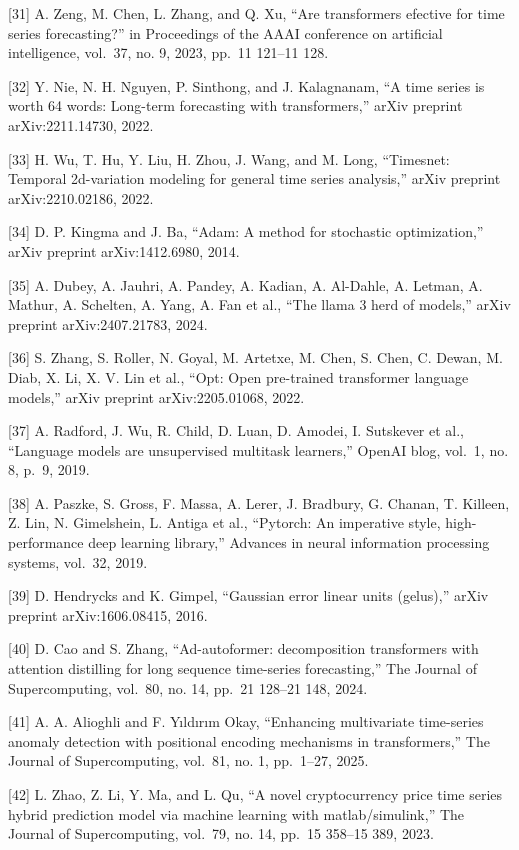 \documentclass[
  10
]{article}
\begin{document}
{[}31{]} A. Zeng, M. Chen, L. Zhang, and Q. Xu, ``Are transformers
efective for time series forecasting?'' in Proceedings of the AAAI
conference on artificial intelligence, vol.~37, no. 9, 2023, pp.~11
121--11 128.

{[}32{]} Y. Nie, N. H. Nguyen, P. Sinthong, and J. Kalagnanam, ``A time
series is worth 64 words: Long-term forecasting with transformers,''
arXiv preprint arXiv:2211.14730, 2022.

{[}33{]} H. Wu, T. Hu, Y. Liu, H. Zhou, J. Wang, and M. Long,
``Timesnet: Temporal 2d-variation modeling for general time series
analysis,'' arXiv preprint arXiv:2210.02186, 2022.

{[}34{]} D. P. Kingma and J. Ba, ``Adam: A method for stochastic
optimization,'' arXiv preprint arXiv:1412.6980, 2014.

{[}35{]} A. Dubey, A. Jauhri, A. Pandey, A. Kadian, A. Al-Dahle, A.
Letman, A. Mathur, A. Schelten, A. Yang, A. Fan et al., ``The llama 3
herd of models,'' arXiv preprint arXiv:2407.21783, 2024.

{[}36{]} S. Zhang, S. Roller, N. Goyal, M. Artetxe, M. Chen, S. Chen, C.
Dewan, M. Diab, X. Li, X. V. Lin et al., ``Opt: Open pre-trained
transformer language models,'' arXiv preprint arXiv:2205.01068, 2022.

{[}37{]} A. Radford, J. Wu, R. Child, D. Luan, D. Amodei, I. Sutskever
et al., ``Language models are unsupervised multitask learners,'' OpenAI
blog, vol.~1, no. 8, p.~9, 2019.

{[}38{]} A. Paszke, S. Gross, F. Massa, A. Lerer, J. Bradbury, G.
Chanan, T. Killeen, Z. Lin, N. Gimelshein, L. Antiga et al., ``Pytorch:
An imperative style, high-performance deep learning library,'' Advances
in neural information processing systems, vol.~32, 2019.

{[}39{]} D. Hendrycks and K. Gimpel, ``Gaussian error linear units
(gelus),'' arXiv preprint arXiv:1606.08415, 2016.

{[}40{]} D. Cao and S. Zhang, ``Ad-autoformer: decomposition
transformers with attention distilling for long sequence time-series
forecasting,'' The Journal of Supercomputing, vol.~80, no. 14, pp.~21
128--21 148, 2024.

{[}41{]} A. A. Alioghli and F. Yıldırım Okay, ``Enhancing multivariate
time-series anomaly detection with positional encoding mechanisms in
transformers,'' The Journal of Supercomputing, vol.~81, no. 1,
pp.~1--27, 2025.

{[}42{]} L. Zhao, Z. Li, Y. Ma, and L. Qu, ``A novel cryptocurrency
price time series hybrid prediction model via machine learning with
matlab/simulink,'' The Journal of Supercomputing, vol.~79, no. 14,
pp.~15 358--15 389, 2023.
\end{document}
